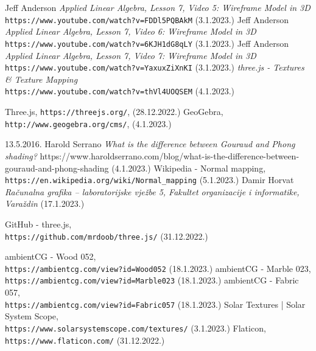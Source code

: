 \documentclass[a4paper,12pt]{article}
\begin{document}
\begin{thebibliography}{9}

 Jeff Anderson \emph{Applied Linear Algebra, Lesson 7, Video 5: Wireframe Model in 3D} \texttt{https://www.youtube.com/watch?v=FDDl5PQBAkM} (3.1.2023.)
 Jeff Anderson \emph{Applied Linear Algebra, Lesson 7, Video 6: Wireframe Model in 3D} \texttt{https://www.youtube.com/watch?v=6KJH1dG8qLY} (3.1.2023.)
 Jeff Anderson \emph{Applied Linear Algebra, Lesson 7, Video 7: Wireframe Model in 3D} \texttt{https://www.youtube.com/watch?v=YaxuxZiXnKI} (3.1.2023.)
 \emph{three.js - Textures \& Texture Mapping}\\\texttt{https://www.youtube.com/watch?v=thVl4UOQSEM} (4.1.2023.)

 Three.js, \texttt{https://threejs.org/}, (28.12.2022.)
 GeoGebra, \texttt{http://www.geogebra.org/cms/}, (4.1.2023.)

  13.5.2016. Harold Serrano \emph{What is the difference between Gouraud and Phong shading?} https://www.haroldserrano.com/blog/what-is-the-difference-between-gouraud-and-phong-shading (4.1.2023.)
 Wikipedia - Normal mapping,\\\texttt{https://en.wikipedia.org/wiki/Normal\_mapping} (5.1.2023.)
 Damir Horvat \emph{Računalna grafika – laboratorijske vježbe 5, Fakultet organizacije i informatike, Varaždin} (17.1.2023.)

 GitHub - three.js,\\\texttt{https://github.com/mrdoob/three.js/} (31.12.2022.)

 ambientCG - Wood 052,\\\texttt{https://ambientcg.com/view?id=Wood052} (18.1.2023.)
 ambientCG - Marble 023,\\\texttt{https://ambientcg.com/view?id=Marble023} (18.1.2023.)
 ambientCG - Fabric 057,\\\texttt{https://ambientcg.com/view?id=Fabric057} (18.1.2023.)
 Solar Textures | Solar System Scope,\\\texttt{https://www.solarsystemscope.com/textures/} (3.1.2023.)
 Flaticon,\\\texttt{https://www.flaticon.com/} (31.12.2022.)

\end{thebibliography}
\end{document}

